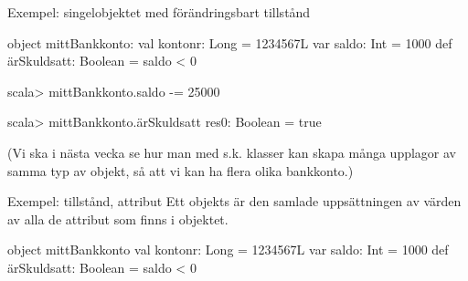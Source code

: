\begin{Slide}{Exempel: singelobjektet med förändringsbart tillstånd} \SlideFontSmall
\begin{Code}[basicstyle=\ttfamily\fontsize{9}{11}\selectfont]
object mittBankkonto:
  val kontonr: Long        = 1234567L
  var saldo: Int           = 1000
  def ärSkuldsatt: Boolean = saldo < 0
\end{Code}
\begin{REPLnonum}
scala> mittBankkonto.saldo -= 25000

scala> mittBankkonto.ärSkuldsatt
res0: Boolean = true
\end{REPLnonum}

(Vi ska i nästa vecka se hur man med s.k. klasser kan skapa många upplagor av samma  typ av objekt, så att vi kan ha flera olika bankkonto.)
\end{Slide}



\begin{Slide}{Exempel: tillstånd, attribut}
Ett objekts  är den samlade uppsättningen av värden av alla de attribut som finns i objektet.
\begin{Code}[basicstyle=\ttfamily\fontsize{9}{11}\selectfont]
object mittBankkonto
  val kontonr: Long        = 1234567L
  var saldo: Int           = 1000
  def ärSkuldsatt: Boolean = saldo < 0
\end{Code}
\end{Slide}


